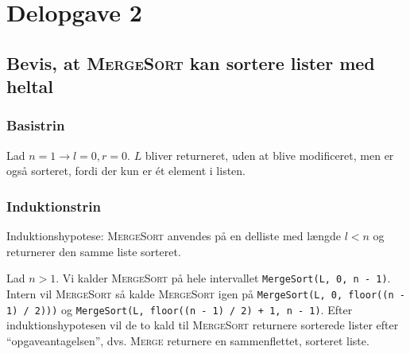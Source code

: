 \section{Delopgave 2}\label{sec:delopgave-23}

\subsection{Bevis, at \textsc{MergeSort} kan sortere lister med heltal}
\label{subsec:bevis-at-mergesort-kan-sortere-lister-med-heltal}

\subsubsection{Basistrin}

Lad \(n = 1 \rightarrow l = 0, r = 0\).
\(L\) bliver returneret, uden at blive modificeret, men er også sorteret, fordi der kun er ét element i listen.

\subsubsection{Induktionstrin}

Induktionshypotese: \textsc{MergeSort} anvendes på en delliste med længde \(l < n\) og returnerer den samme liste
sorteret.

Lad \(n > 1\).
Vi kalder \textsc{MergeSort} på hele intervallet \lstinline{MergeSort(L, 0, n - 1)}.
Intern vil \textsc{MergeSort} så kalde \textsc{MergeSort} igen på \lstinline{MergeSort(L, 0, floor((n - 1) / 2)))} og
\lstinline{MergeSort(L, floor((n - 1) / 2) + 1, n - 1)}.
Efter induktionshypotesen vil de to kald til \textsc{MergeSort} returnere sorterede lister efter ``opgaveantagelsen'',
dvs. \textsc{Merge} returnere en sammenflettet, sorteret liste.
